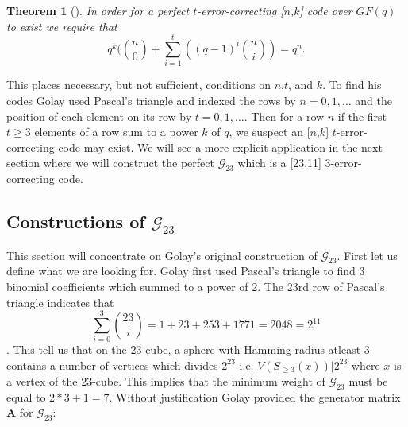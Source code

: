\documentclass[paper=a4, fontsize=11pt]{scrartcl} %
\numberwithin{equation}{section} %
\numberwithin{figure}{section} %
\numberwithin{table}{section} %
\newtheorem{thm}{Theorem}
\begin{document}
\begin{thm}[\cite{pless}]
In order for a perfect $t$-error-correcting [$n$,$k$] code over $GF(q)$ to exist we require that
$$
q^k ({n \choose 0} +  \sum_{i=1}^t ((q-1)^i{n \choose i}) = q^n. 
$$
\end{thm}

This places necessary, but not sufficient, conditions on $n$,$t$, and $k$. To find his codes Golay used Pascal's triangle and indexed the rows by $n = 0, 1, \ldots$ and the position of each element on its row by $t = 0,1, \ldots$. Then for a row $n$ if the first $t \geq 3$ elements of a row sum to a power $k$ of $q$, we suspect an [$n$,$k$] $t$-error-correcting code may exist. We will see a more explicit application in the next section where we will construct the perfect $\mathcal{G}_{23}$ which is a [23,11] 3-error-correcting code.
\subsection{Constructions of $\mathcal{G}_{23}$}
This section will concentrate on Golay's original construction of $\mathcal{G}_{23}$. First let us define what we are looking for.
Golay first used Pascal's triangle to find 3 binomial coefficients which summed to a power of 2. The 23rd row of Pascal's triangle indicates that
$$\sum_{i=0}^3 {23 \choose i} = 1+23+253+1771 = 2048 = 2^{11}$$. This tell us that on the 23-cube, a sphere with Hamming radius atleast 3 contains a number of vertices which divides $2^{23}$ i.e. $V(S_{\geq 3}(x) )|2^{23}$ where $x$ is a vertex of the 23-cube. This implies that the minimum weight of $\mathcal{G}_{23}$ must be equal to $2*3+1=7$. Without justification Golay provided the generator matrix $\mathbf{A}$ for $\mathcal{G}_{23}$:
\end{document}
